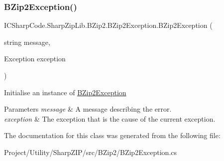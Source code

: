 \subsubsection{\texorpdfstring{B\+Zip2\+Exception()}{BZip2Exception()}\hspace{0.1cm}{\footnotesize\ttfamily [4/4]}}
{\footnotesize\ttfamily I\+C\+Sharp\+Code.\+Sharp\+Zip\+Lib.\+B\+Zip2.\+B\+Zip2\+Exception.\+B\+Zip2\+Exception (\begin{DoxyParamCaption}\item[{string}]{message,  }\item[{Exception}]{exception }\end{DoxyParamCaption})\hspace{0.3cm}{\ttfamily [inline]}}



Initialise an instance of \hyperlink{class_i_c_sharp_code_1_1_sharp_zip_lib_1_1_b_zip2_1_1_b_zip2_exception}{B\+Zip2\+Exception} 


\begin{DoxyParams}{Parameters}
{\em message} & A message describing the error.\\
\hline
{\em exception} & The exception that is the cause of the current exception.\\
\hline
\end{DoxyParams}


The documentation for this class was generated from the following file\+:\begin{DoxyCompactItemize}
\item 
Project/\+Utility/\+Sharp\+Z\+I\+P/src/\+B\+Zip2/B\+Zip2\+Exception.\+cs\end{DoxyCompactItemize}
